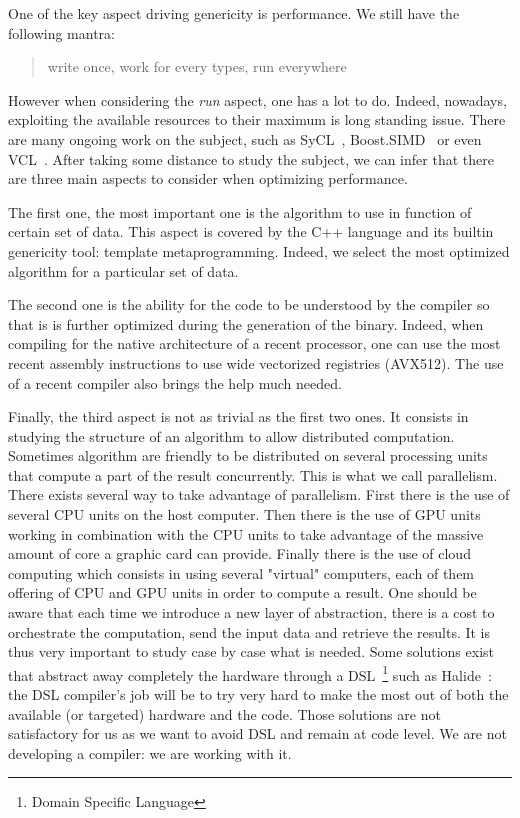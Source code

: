 One of the key aspect driving genericity is performance. We still have the following mantra: \blockquote{write once,
  work for every types, run everywhere}. However when considering the \emph{run} aspect, one has a lot to do. Indeed,
nowadays, exploiting the available resources to their maximum is long standing issue. There are many ongoing work on the
subject, such as SyCL~\cite{brown.2019.heterogeneous,wong.2019.heterogeneous}, Boost.SIMD~\cite{esterie.2014.boostsimd}
or even VCL~\cite{fog.2013.vcl}. After taking some distance to study the subject, we can infer that there are three main
aspects to consider when optimizing performance.

The first one, the most important one is the algorithm to use in function of certain set of data. This aspect is covered
by the C++ language and its builtin genericity tool: template metaprogramming. Indeed, we select the most optimized
algorithm for a particular set of data.

The second one is the ability for the code to be understood by the compiler so that is is further optimized during the
generation of the binary. Indeed, when compiling for the native architecture of a recent processor, one can use the most
recent assembly instructions to use wide vectorized registries (AVX512). The use of a recent compiler also brings the
help much needed.

Finally, the third aspect is not as trivial as the first two ones. It consists in studying the structure of an algorithm
to allow distributed computation. Sometimes algorithm are friendly to be distributed on several processing units that
compute a part of the result concurrently. This is what we call parallelism. There exists several way to take advantage
of parallelism. First there is the use of several CPU units on the host computer. Then there is the use of GPU units
working in combination with the CPU units to take advantage of the massive amount of core a graphic card can provide.
Finally there is the use of cloud computing which consists in using several "virtual" computers, each of them offering
of CPU and GPU units in order to compute a result. One should be aware that each time we introduce a new layer of
abstraction, there is a cost to orchestrate the computation, send the input data and retrieve the results. It is thus
very important to study case by case what is needed. Some solutions exist that abstract away completely the hardware
through a DSL~\footnote{Domain Specific Language} such as Halide~\cite{ragankelley.2013.halide}: the DSL compiler's job
will be to try very hard to make the most out of both the available (or targeted) hardware and the code. Those solutions
are not satisfactory for us as we want to avoid DSL and remain at code level. We are not developing a compiler: we are
working with it.

